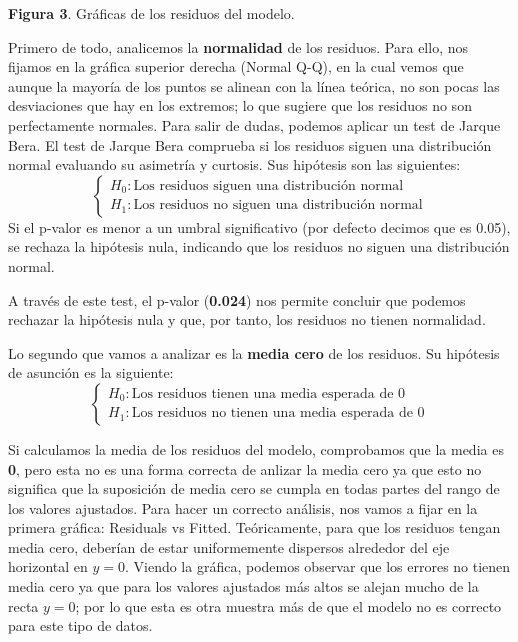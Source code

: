 \documentclass[
  letterpaper,
  DIV=11,
  numbers=noendperiod]{scrreprt}
\begin{document}
\textbf{Figura 3}. Gráficas de los residuos del modelo.

Primero de todo, analicemos la \textbf{normalidad} de los residuos. Para
ello, nos fijamos en la gráfica superior derecha (Normal Q-Q), en la
cual vemos que aunque la mayoría de los puntos se alinean con la línea
teórica, no son pocas las desviaciones que hay en los extremos; lo que
sugiere que los residuos no son perfectamente normales. Para salir de
dudas, podemos aplicar un test de Jarque Bera. El test de Jarque Bera
comprueba si los residuos siguen una distribución normal evaluando su
asimetría y curtosis. Sus hipótesis son las siguientes: \[
\begin{cases} 
H_0 : \text{Los residuos siguen una distribución normal} \\ 
H_1 : \text{Los residuos no siguen una distribución normal}
\end{cases}
\] Si el p-valor es menor a un umbral significativo (por defecto decimos
que es 0.05), se rechaza la hipótesis nula, indicando que los residuos
no siguen una distribución normal.

A través de este test, el p-valor (\textbf{0.024}) nos permite concluir
que podemos rechazar la hipótesis nula y que, por tanto, los residuos no
tienen normalidad.

Lo segundo que vamos a analizar es la \textbf{media cero} de los
residuos. Su hipótesis de asunción es la siguiente: \[
\begin{cases} 
H_0 : \text{Los residuos tienen una media esperada de 0} \\ 
H_1 : \text{Los residuos no tienen una media esperada de 0}
\end{cases}
\]

Si calculamos la media de los residuos del modelo, comprobamos que la
media es \textbf{0}, pero esta no es una forma correcta de anlizar la
media cero ya que esto no significa que la suposición de media cero se
cumpla en todas partes del rango de los valores ajustados. Para hacer un
correcto análisis, nos vamos a fijar en la primera gráfica: Residuals vs
Fitted. Teóricamente, para que los residuos tengan media cero, deberían
de estar uniformemente dispersos alrededor del eje horizontal en
\(y=0\). Viendo la gráfica, podemos observar que los errores no tienen
media cero ya que para los valores ajustados más altos se alejan mucho
de la recta \(y=0\); por lo que esta es otra muestra más de que el
modelo no es correcto para este tipo de datos.
\end{document}
